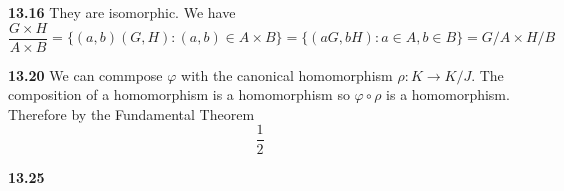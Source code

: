 \documentclass[12pt]{article}
\newenvironment{ques}{\vspace{2 ex}}{\vspace{2 ex}}
\theoremstyle{definition}
\begin{document}
\begin{ques}
	\textbf{13.16} 
		They are isomorphic. We have
		$$\frac{G \times H}{A \times B} = \{(a, b)(G, H): (a, b) \in A
		\times B\} = \{(aG, bH): a \in A, b \in B\} = G/A \times H/B$$
\end{ques}

\begin{ques} 
	\textbf{13.20} 
		We can commpose $\varphi$ with the canonical homomorphism $\rho
		: K \to K/J$. The composition of a homomorphism is a
		homomorphism so $\varphi \circ \rho$ is a homomorphism.
		Therefore by the Fundamental Theorem 
		$$\frac 1 2$$
\end{ques}

\begin{ques} 
	\textbf{13.25} 
\end{ques}
\end{document}
